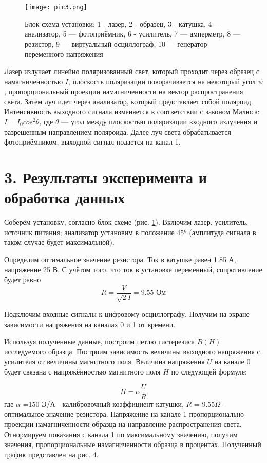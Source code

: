 \documentclass[a4paper,12pt]{report}
\begin{document}
\begin{figure}[H]
    \centering
    \texttt{[image: pic3.png]} \label{setup}
    \caption{Блок-схема установки: 1 - лазер, 2 - образец, 3 - катушка, 4 — анализатор, 5 — фотоприёмник, 6 - усилитель,
7 — амперметр, 8 — резистор, 9 — виртуальный осциллограф, 10 — генератор переменного напряжения}
\end{figure}

Лазер излучает линейно поляризованный свет, который проходит через образец с намагниченностью $I$, плоскость поляризации поворачивается на некоторый угол $\psi$, пропорциональный проекции намагниченности на вектор распространения света. Затем луч идет через анализатор, который представляет собой поляроид. Интенсивность выходного сигнала изменяется в
соответствии с законом Малюса: $I = I_{0}cos^2\theta$, где $\theta$ — угол между плоскостью поляризации входного излучения и разрешенным направлением поляроида. Далее луч света обрабатывается фотоприёмником, выходной сигнал подается на канал 1.

\section*{3. Результаты эксперимента и обработка данных}
Соберём установку, согласно блок-схеме (рис. \ref{setup}). Включим лазер, усилитель, источник питания; анализатор установим в положение 45° (амплитуда сигнала в таком случае будет максимальной).

Определим оптимальное значение резистора. Ток в катушке равен 1.85 А, напряжение 25 В. С учётом того, что ток в установке переменный, сопротивление будет равно
 \begin{equation*}
     R = \frac{V}{\sqrt{2} I} = 9.55 \text{ Ом}
 \end{equation*}

Подключим входные сигналы к цифровому осциллографу. Получим на экране зависимости напряжения на каналах 0 и 1 от времени.

Используя полученные данные, построим петлю гистерезиса $B(H)$ исследуемого образца. Построим зависимость величины выходного напряжения с усилителя от величины магнитного поля. Величина напряжения $U$ на канале 0 будет связана с напряжённостью магнитного поля $H$ по следующей формуле:

  \begin{equation*}
     H =  \alpha \frac{U}{R}
 \end{equation*}
где $\alpha$ =150 Э/А - калибровочный коэффициент катушки, $R$ = 9.55$\Omega$ - оптимальное значение резистора. Напряжение на канале 1 пропорционально проекции намагниченности образца на направление
распространения света. Отнормируем показания с канала 1 по максимальному значению, получим значения, пропорциональные намагниченности образца в процентах. Полученный график представлен на рис. 4.
\end{document}
